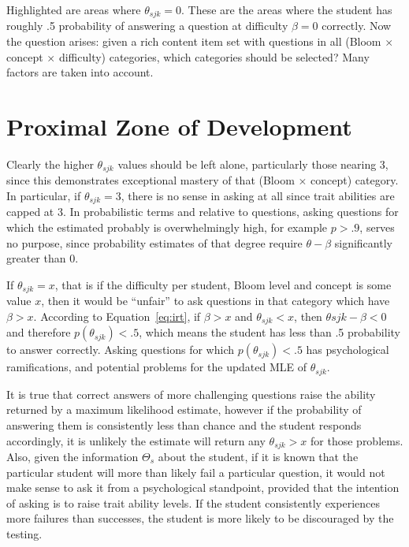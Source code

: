 Highlighted are areas where $\theta_{sjk} = 0$. These are the areas where the
student has roughly .5 probability of answering a question at difficulty
$\beta=0$ correctly.  Now the question arises: given a rich content item set
with questions in all (Bloom $\times$ concept $\times$ difficulty) categories,
which categories should be selected?  Many factors are taken into account.

\section{Proximal Zone of Development}

Clearly the higher $\theta_{sjk}$ values should be left alone, particularly
those nearing 3, since this demonstrates exceptional mastery of that (Bloom
$\times$ concept) category.  In particular, if $\theta_{sjk} = 3$, there is no
sense in asking at all since trait abilities are capped at 3.  In probabilistic
terms and relative to questions, asking questions for which the estimated
probably is overwhelmingly high, for example $p > .9$, serves no purpose, since
probability estimates of that degree require $\theta-\beta$ significantly
greater than 0.

If $\theta_{sjk} = x$, that is if the difficulty per student, Bloom level and
concept is some value $x$, then it would be ``unfair'' to ask questions in that
category which have $\beta > x$.  According to Equation~\ref{eq:irt}, if $\beta
> x$ and $\theta_{sjk} < x$, then $\theta{sjk}-\beta < 0$ and therefore
$p(\theta_{sjk}) < .5$, which means the student has less than .5 probability to
answer correctly.  Asking questions for which $p(\theta_{sjk}) < .5$ has
psychological ramifications, and potential problems for the updated MLE of
$\theta_{sjk}$.

It is true that correct answers of more challenging questions raise the ability
returned by a maximum likelihood estimate, however if the probability of
answering them is consistently less than chance and the student responds
accordingly, it is unlikely the estimate will return any $\theta_{sjk} > x$ for
those problems.  Also, given the information $\Theta_s$ about the student, if
it is known that the particular student will more than likely fail a particular
question, it would not make sense to ask it from a psychological standpoint,
provided that the intention of asking is to raise trait ability levels.  If the
student consistently experiences more failures than successes, the student is
more likely to be discouraged by the testing. 

